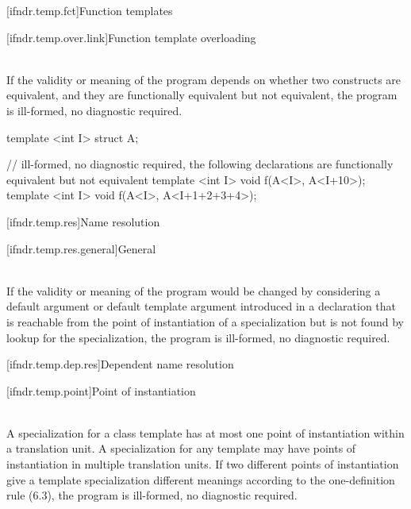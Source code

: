 [ifndr.temp.fct]{Function templates}

[ifndr.temp.over.link]{Function template overloading}

\pnum
{} \\
If the validity or meaning of the program depends on whether two constructs are equivalent, and they are
functionally equivalent but not equivalent, the program is ill-formed, no diagnostic required.

\pnum
\begin{example}
\begin{codeblock}
template <int I>
struct A{};

// ill-formed, no diagnostic required, the following declarations are functionally equivalent but not equivalent
template <int I> void f(A<I>, A<I+10>);
template <int I> void f(A<I>, A<I+1+2+3+4>);
\end{codeblock}
\end{example}

[ifndr.temp.res]{Name resolution}

[ifndr.temp.res.general]{General}

\pnum
{} \\
If the validity or meaning of the program would be changed by considering a default argument or default
template argument introduced in a declaration that is reachable from the point of instantiation of a
specialization but is not found by lookup for the specialization, the program is ill-formed, no
diagnostic required.

\pnum
\begin{example}
\begin{codeblock}
\end{codeblock}
\end{example}

[ifndr.temp.dep.res]{Dependent name resolution}

[ifndr.temp.point]{Point of instantiation}

\pnum
{} \\
A specialization for a class template has at most one point of instantiation within a translation unit. A
specialization for any template may have points of instantiation in multiple translation units. If two different
points of instantiation give a template specialization different meanings according to the one-definition
rule (6.3), the program is ill-formed, no diagnostic required.

